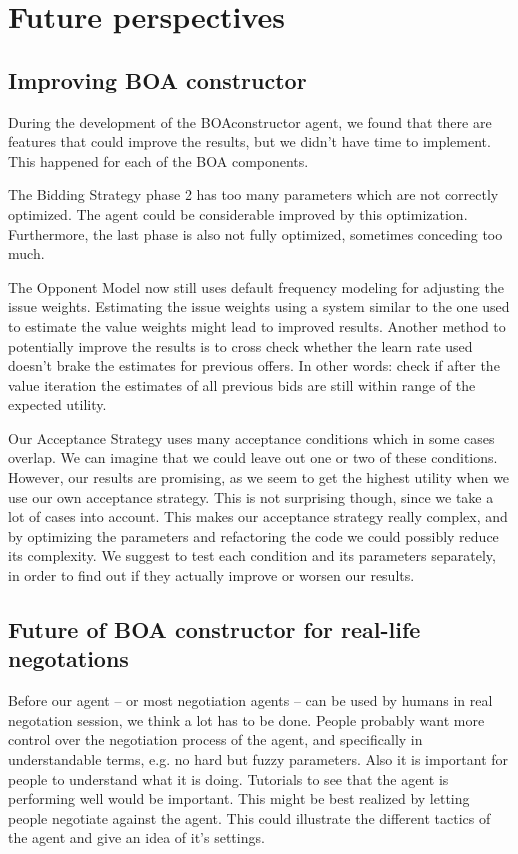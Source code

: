 \section{Future perspectives}
\label{sec:future}
\subsection{Improving BOA constructor}
During the development of the BOAconstructor agent, we found that there are features that could improve the results, but we didn't have time to implement. This happened for each of the BOA components.

The Bidding Strategy phase 2 has too many parameters which are not correctly optimized.
The agent could be considerable improved by this optimization. Furthermore, 
the last phase is also not fully optimized, sometimes conceding too much.

The Opponent Model now still uses default frequency modeling for adjusting the issue weights. Estimating the issue weights using a system similar to the one used to estimate the value weights might lead to improved results. Another method to potentially improve the results is to cross check whether the learn rate used doesn't brake the estimates for previous offers. In other words: check if after the value iteration the estimates of all previous bids are still within range of the expected utility. 

Our Acceptance Strategy uses many acceptance conditions which in some cases overlap. We can imagine that we could leave out one or two of these conditions. However, our results are promising, as we seem to get the highest utility when we use our own acceptance strategy. This is not surprising though, since we take a lot of cases into account. This makes our acceptance strategy really complex, and by optimizing the parameters and refactoring the code we could possibly reduce its complexity. We suggest to test each condition and its parameters separately, in order to find out if they actually improve or worsen our results.

\subsection{Future of BOA constructor for real-life negotations}
Before our agent -- or most negotiation agents -- can be used by humans in real negotation 
session, we think a lot has to be done. People probably want more control over the 
negotiation process of the agent, and specifically in understandable terms, e.g. no hard but fuzzy parameters.
Also it is important for people to understand what it is doing. 
Tutorials to see that the agent is performing well would be important. 
This might be best realized by letting people negotiate against the agent. 
This could illustrate the different tactics of the agent and give an idea of it's settings.

